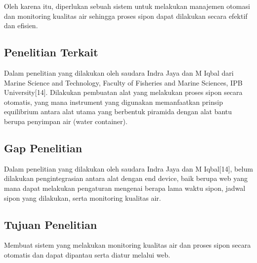 \noindent Oleh karena itu, diperlukan sebuah sistem untuk melakukan manajemen otomasi dan monitoring kualitas air sehingga proses sipon dapat dilakukan secara efektif dan efisien.

\subsection{Penelitian Terkait}
\label{sec:Penelitian Terkait}

Dalam penelitian yang dilakukan oleh saudara Indra Jaya dan M Iqbal dari Marine Science and Technology, Faculty of Fisheries and Marine Sciences, IPB University[14]. Dilakukan pembuatan alat yang melakukan proses sipon secara otomatis, yang mana instrument yang digunakan memanfaatkan prinsip equilibrium antara alat utama yang berbentuk piramida dengan alat bantu berupa penyimpan air (water container).

\subsection{Gap Penelitian}
\label{sec:Gap Penelitian}

Dalam penelitian yang dilakukan oleh saudara Indra Jaya dan M Iqbal[14], belum dilakukan pengintegrasian antara alat dengan end device, baik  berupa web yang mana dapat melakukan pengaturan mengenai berapa lama waktu sipon, jadwal sipon yang dilakukan, serta monitoring kualitas air.

\subsection{Tujuan Penelitian}
\label{sec:Tujuan Penelitian}

Membuat sistem yang melakukan monitoring kualitas air dan proses sipon secara otomatis dan dapat dipantau serta diatur melalui web.

